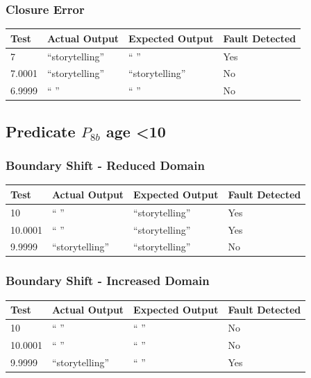 \documentclass[11pt, oneside]{article}   	%
\begin{document}
\subsubsection{Closure Error}
\begin{table}[!htb]
\centering
\begin{tabular}{|l|l|l|l|}
\hline
Test   & Actual Output  & Expected Output & Fault Detected \\ \hline
7      & “storytelling” & “ ”             & Yes            \\ \hline
7.0001 & “storytelling” & “storytelling”  & No             \\ \hline
6.9999 & “ ”            & “ ”             & No             \\ \hline
\end{tabular}
\end{table}
\newpage

\subsection{Predicate $P_{8b}$ age \textless 10}
\subsubsection{Boundary Shift - Reduced Domain}
\begin{table}[!htb]
\centering
\begin{tabular}{|l|l|l|l|}
\hline
Test    & Actual Output  & Expected Output & Fault Detected \\ \hline
10      & “ ”            & “storytelling”  & Yes            \\ \hline
10.0001 & “ ”            & “storytelling”  & Yes            \\ \hline
9.9999  & “storytelling” & “storytelling”  & No             \\ \hline
\end{tabular}
\end{table}

\subsubsection{Boundary Shift - Increased Domain}
\begin{table}[!htb]
\centering
\begin{tabular}{|l|l|l|l|}
\hline
Test    & Actual Output  & Expected Output & Fault Detected \\ \hline
10      & “ ”            & “ ”             & No             \\ \hline
10.0001 & “ ”            & “ ”             & No             \\ \hline
9.9999  & “storytelling” & “ ”             & Yes            \\ \hline
\end{tabular}
\end{table}
\end{document}
